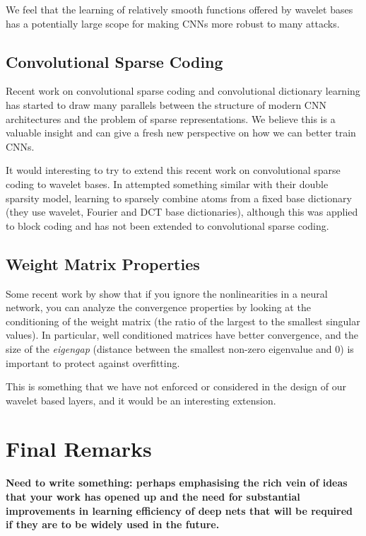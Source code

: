 We feel that the learning of relatively smooth functions offered by wavelet bases has a potentially
large scope for making CNNs more robust to many attacks.

\subsection{Convolutional Sparse Coding}
Recent work on convolutional sparse coding and convolutional
dictionary learning \cite{liu_online_2017, liu_first_2017,
papyan_convolutional_2016, papyan_convolutional_2017, papyan_theoretical_2018}
has started to draw many parallels between the
structure of modern CNN architectures and the problem of sparse
representations. We believe this is a valuable insight and can give a fresh new
perspective on how we can better train CNNs. 

It would interesting to try to extend this recent work on
convolutional sparse coding to wavelet bases. In \cite{rubinstein_double_2010}
\citeauthor{rubinstein_double_2010} attempted something similar with their
double sparsity model, learning to sparsely combine atoms from a fixed base
dictionary (they use wavelet, Fourier and DCT base dictionaries), although this
was applied to block coding and has not been extended to convolutional sparse coding.

\subsection{Weight Matrix Properties}
Some recent work by \citeauthor{advani_high-dimensional_2017}
\cite{advani_high-dimensional_2017} show that if you ignore the
nonlinearities in a neural network, you can analyze the convergence properties
by looking at the conditioning of the weight matrix (the ratio of the largest to
the smallest singular values). In particular, well conditioned matrices have
better convergence, and the size of the \emph{eigengap} (distance between the
smallest non-zero eigenvalue and 0) is important to protect against overfitting.

This is something that we have not enforced or considered in the design of our
wavelet based layers, and it would be an interesting extension.

\section{Final Remarks}
\textbf{
 Need to write something: perhaps emphasising the rich vein of ideas that your work has opened up and the
 need for substantial improvements in learning efficiency of deep nets that will
 be required if they are to be widely used in the future.}
